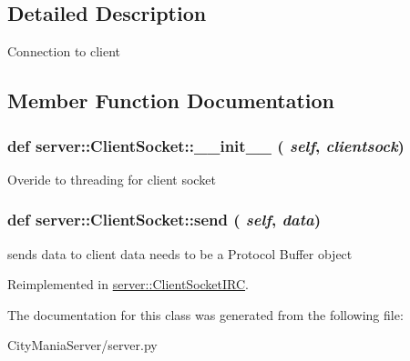 \subsection{Detailed Description}
\begin{DoxyVerb}
Connection to client
\end{DoxyVerb}
 

\subsection{Member Function Documentation}
\hypertarget{classserver_1_1ClientSocket_aaeb638a576ccbac7a8a0d96a680b55fe}{
\subsubsection[{\_\-\_\-init\_\-\_\-}]{\setlength{\rightskip}{0pt plus 5cm}def server::ClientSocket::\_\-\_\-init\_\-\_\- ( {\em self}, \/   {\em clientsock})}}
\label{classserver_1_1ClientSocket_aaeb638a576ccbac7a8a0d96a680b55fe}
\begin{DoxyVerb}
Overide to threading for client socket
\end{DoxyVerb}
 \hypertarget{classserver_1_1ClientSocket_af0ce9184f5505c6fee6cc4a767f84198}{
\subsubsection[{send}]{\setlength{\rightskip}{0pt plus 5cm}def server::ClientSocket::send ( {\em self}, \/   {\em data})}}
\label{classserver_1_1ClientSocket_af0ce9184f5505c6fee6cc4a767f84198}
\begin{DoxyVerb}
sends data to client
data needs to be a Protocol Buffer object
\end{DoxyVerb}
 

Reimplemented in \hyperlink{classserver_1_1ClientSocketIRC_a513635125e7ae1ef86175971b09b9a0c}{server::ClientSocketIRC}.

The documentation for this class was generated from the following file:\begin{DoxyCompactItemize}
\item 
CityManiaServer/server.py\end{DoxyCompactItemize}
